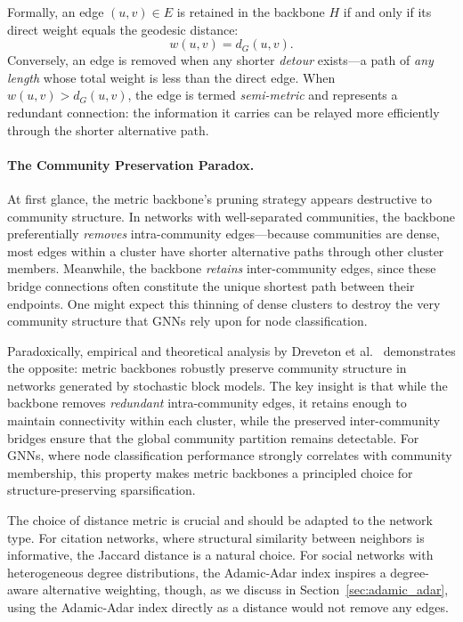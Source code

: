 \documentclass[conference]{IEEEtran}
\begin{document}
Formally, an edge $(u, v) \in E$ is retained in the backbone $H$ if and only if its direct weight equals the geodesic distance:
\begin{equation}
    w(u, v) = d_G(u, v).
    \label{eq:metric_backbone}
\end{equation}
Conversely, an edge is removed when any shorter \emph{detour} exists---a path of \emph{any length} whose total weight is less than the direct edge. When $w(u,v) > d_G(u,v)$, the edge is termed \emph{semi-metric} and represents a redundant connection: the information it carries can be relayed more efficiently through the shorter alternative path.

\paragraph{The Community Preservation Paradox.} At first glance, the metric backbone's pruning strategy appears destructive to community structure. In networks with well-separated communities, the backbone preferentially \emph{removes} intra-community edges---because communities are dense, most edges within a cluster have shorter alternative paths through other cluster members. Meanwhile, the backbone \emph{retains} inter-community edges, since these bridge connections often constitute the unique shortest path between their endpoints. One might expect this thinning of dense clusters to destroy the very community structure that GNNs rely upon for node classification.

Paradoxically, empirical and theoretical analysis by Dreveton et al.~\cite{dreveton2024} demonstrates the opposite: metric backbones robustly preserve community structure in networks generated by stochastic block models. The key insight is that while the backbone removes \emph{redundant} intra-community edges, it retains enough to maintain connectivity within each cluster, while the preserved inter-community bridges ensure that the global community partition remains detectable. For GNNs, where node classification performance strongly correlates with community membership, this property makes metric backbones a principled choice for structure-preserving sparsification.

The choice of distance metric is crucial and should be adapted to the network type. For citation networks, where structural similarity between neighbors is informative, the Jaccard distance is a natural choice. For social networks with heterogeneous degree distributions, the Adamic-Adar index inspires a degree-aware alternative weighting, though, as we discuss in Section~\ref{sec:adamic_adar}, using the Adamic-Adar index directly as a distance would not remove any edges.
\end{document}
